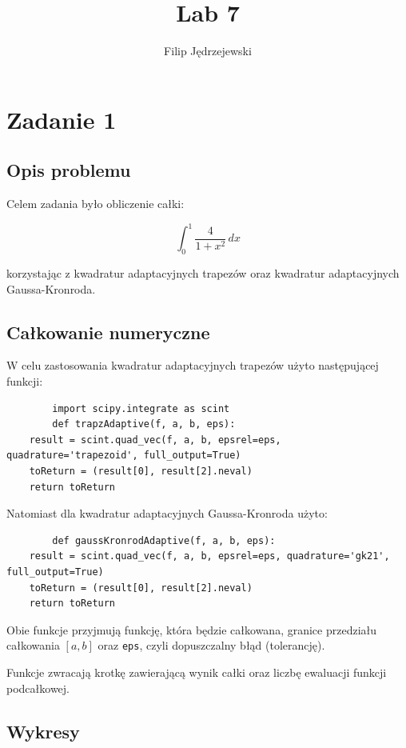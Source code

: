 \documentclass{article}
\title{Lab 7}
\author{Filip Jędrzejewski}
\begin{document}
	\maketitle
	
	\section*{Zadanie 1}
	
	\subsection*{Opis problemu}

	Celem zadania było obliczenie całki:

	\begin{equation}
		\int_{0}^{1} \frac{4}{1 + x^2} \,dx
	\end{equation}

	korzystając z kwadratur adaptacyjnych trapezów oraz kwadratur adaptacyjnych Gaussa-Kronroda.


	\subsection*{Całkowanie numeryczne}

	W celu zastosowania kwadratur adaptacyjnych trapezów użyto następującej funkcji:

	\begin{verbatim}
		import scipy.integrate as scint
		def trapzAdaptive(f, a, b, eps):
    result = scint.quad_vec(f, a, b, epsrel=eps, quadrature='trapezoid', full_output=True)
    toReturn = (result[0], result[2].neval)
    return toReturn
	\end{verbatim}
	
	Natomiast dla kwadratur adaptacyjnych Gaussa-Kronroda użyto:

	\begin{verbatim}
		def gaussKronrodAdaptive(f, a, b, eps):
    result = scint.quad_vec(f, a, b, epsrel=eps, quadrature='gk21', full_output=True)
    toReturn = (result[0], result[2].neval)
    return toReturn
	\end{verbatim}

	Obie funkcje przyjmują funkcję, która będzie całkowana, granice przedziału całkowania $[a,b]$ oraz \texttt{eps}, czyli dopuszczalny błąd (tolerancję).

	Funkcje zwracają krotkę zawierającą wynik całki oraz liczbę ewaluacji funkcji podcałkowej.

	
	\subsection*{Wykresy}
\end{document}
